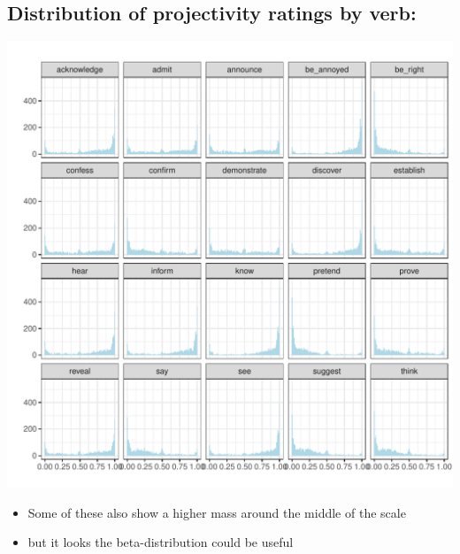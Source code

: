 \documentclass[10pt]{article}\usepackage[]{graphicx}\usepackage[]{color}
\newenvironment{knitrout}{}{} %
\begin{document}
\subsection{Distribution of projectivity ratings by verb:}
\begin{knitrout}
\color{fgcolor}

{\centering \includegraphics[width=\linewidth]{figures/figuresproject-by-v-distr-1} 

}


\end{knitrout}

\begin{itemize}
  \item Some of these also show a higher mass around the middle of the scale
  \item but it looks the beta-distribution could be useful
\end{itemize}


\newpage
\end{document}
